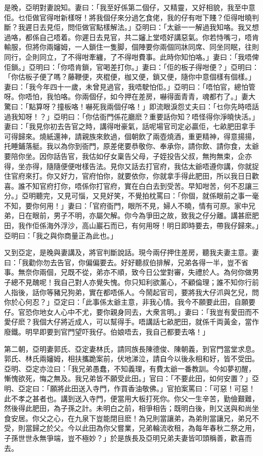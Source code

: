 \documentclass[a5paper, 12pt, openany]{book} %
\begin{document}
	是晚，亞明對妻說知。妻曰：「我至好係第二個仔，又精靈，又好相貌，我至中意佢。乜佢做官得咁新樣呀！將我個仔來分過乞食佬，我的仔有咁下賤？佢得咁曉判斷？我遲日去見佢，問佢做官點樣解法。」亞明曰：「太爺一一解過我知咯。我又想過咯，都係自己唔着。你遲日去見官，共二嬸上堂唔好講惡氣。你若恃嘴刁，唔肯輸服，但將你兩嬸姆，一人鎖住一隻脚，個陣要你兩個同牀同席、同坐同眠，往則同行，企則同立，了不得咁牽纏，了不得咁費事。此時你知怕咯。」妻曰：「我唔俾佢鎖。」亞明曰：「你唔肯鎖，官喝差打你。」妻曰：「佢的板子得咁便？」亞明曰：「你估板子便了嗎？藤鞭便，夾棍便，枷又便，鎖又便，隨你中意個樣有個樣。」妻曰：「我今年四十一歲，未曾見過官，我唔駛怕佢。」亞明曰：「唔怕官，總怕管呀。你唔怕，我怕咯。你兩個仔，如今押在差房，嚇得面青青，魂都冇了。」妻大驚曰：「點算呀？撞板咯！嚇死我兩個仔咯！」即流眼淚怨丈夫曰：「乜你先時唔話過我知呀！？」亞明曰：「你估衙門係花廳麽？重要話你知？唔怪得你淨曉快活。」妻曰：「我見你初去告官之時，講得咁豪氣，話呢場官司定必贏佢，七畝肥田拿手可得歸來。燒紙還神，請親族來飲過，個朝飲了兩壺燒酒，重更精神，得意揚揚，托睡鋪落艇。我以為你到衙門，原差佬要恭敬你、奉承你，請你飲、請你食，太爺要陪你坐。因你話告官，我估如仔女稟告父母，子姪投告父叔，無拘無束，企亦得，坐亦得，隨隨便便咁樣告法。見你又話去打官府，我估太爺唔遵你講，你就捉住官府來打。你又好力，官府怕你，就要依你，你就拿手得此肥田，所以我日日歡喜。誰不知官府打你，唔係你打官府，實在白白去到受苦。早知咁苦，何不忍讓三分。」亞明聽完，又見可惱，又見好笑，不覺拍枕罵曰：「你個，就係眼前之事一毫不知，要你何用！」妻曰：「官府衙門，眼所不見，婦人不曉，情有可原。家中兄弟，日在眼前，男子不明，亦屬欠解。你今為爭田之故，致我之仔分離。講甚麽肥田，我作佢係海外浮沙，高山巖石而已，有何用呀！明日即時要去，帶我仔歸來。」亞明曰：「我之與你商量正為此也。」

	又到亞定，是晚與妻講及，將官判斷說話。現今兩仔押住差房，聽我夫妻主意。妻曰：「我勸你勿去告官，你偏偏要去。好好聽叔伯排解，兄弟各得一半，豈不省事。無奈你兩個，兄既不從，弟亦不順，致今日公堂對審，失禮於人。為何你做男子總不見醜呢！我自己對人亦覺失愧。你只知利欲薰心，不顧倫理；誰不知你行前人指後，話你等豬兄狗弟，實在都唔係人。今鬧起官司，要將我大仔沠與乞兒，問你於心何忍？」亞定曰：「此事係太爺主意，非我心情。我今不願要此田，自願要仔。官恐你地女人心中不尤，要你親身同去，大衆言明。」妻曰：「我豈有愛田而不愛仔麽？我個大仔將近成人，可以幫得手。唔講話七畝肥田，就係千両黃金，當作廢鐵。明早即要到官門望吓我仔。伯娘唔去，我自己都要去咯！」

	第二朝，亞明妻郭氏、亞定妻林氏，請同族長陳德俊、陳朝義，到官門當堂求息。郭氏、林氏兩嬸姆，相扶攜跪案前，伏地涕泣，請自今以後永相和好，皆不受田。亞明、亞定亦泣曰：「我兄弟愚蠢，不知義理，有費太爺一番教訓。今如夢初醒，慚愧欲死，悔之無及。我兄弟皆不願受此田。」官曰：「不要此田，如何安置？」亞明、亞定曰：「願將此田送入寺門，作買香油敬佛。」官拍案罵曰：「可惡！可惡！此不孝之甚者也。講到送入寺門，便當用大板打死你。你父一生辛苦，勤儉艱難，然後得此肥田，為子孫之計。未明白之前，相爭相告；既明白後，則又送與和尚坐食安居。你父之心，在九泉下豈能閉目麽！為兄則當讓弟，為弟則當讓兄，弟兄不受，則當歸之於父。今以此田為你父嘗業，兄弟輪流收租，為每年春秋二祭之用，子孫世世永無爭端，豈不極妙？」於是族長及亞明兄弟夫妻皆叩頭稱善，歡喜而去。
\end{document}
